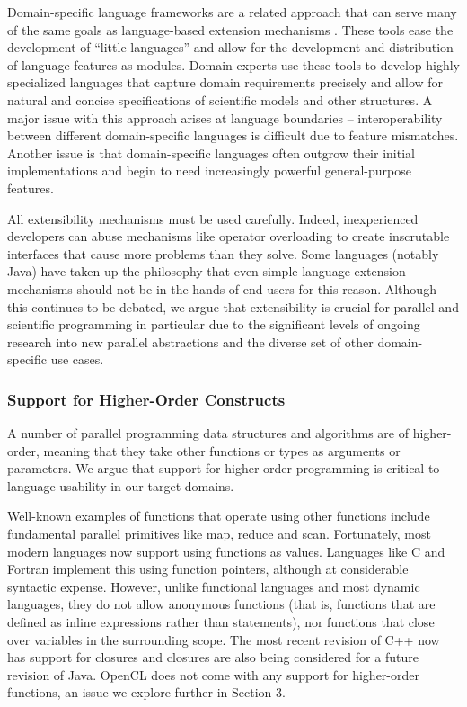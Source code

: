 Domain-specific language frameworks are a related approach that can serve many of the same goals as language-based  extension mechanisms \cite{fowler2010domain}. These tools ease the development of ``little languages'' and allow for the development and distribution of language features as modules. Domain experts use these tools to develop highly specialized languages that capture domain requirements precisely and allow for natural and concise specifications of scientific models and other structures. A major issue with this approach arises at language boundaries -- interoperability between different domain-specific languages is difficult due to feature mismatches. Another issue is that domain-specific languages often outgrow their initial implementations and begin to need increasingly powerful general-purpose features.

All extensibility mechanisms must be used carefully. Indeed, inexperienced developers can abuse mechanisms like operator overloading to create inscrutable interfaces that cause more problems than they solve. Some languages (notably Java) have taken up the philosophy that even simple language extension mechanisms should not be in the hands of end-users for this reason. Although this continues to be debated, we argue that extensibility is crucial for parallel and scientific programming in particular due to the significant levels of ongoing research into new parallel abstractions and the diverse set of other domain-specific use cases.

\subsubsection{Support for Higher-Order Constructs}\label{hof}
A number of parallel programming data structures and algorithms are of higher-order, meaning that they take other functions or types as arguments or parameters. We argue that support for higher-order programming is critical to language usability in our target domains.

Well-known examples of functions that operate using other functions include fundamental parallel primitives like map, reduce and scan. Fortunately, most modern languages now support using functions as values. Languages like C and Fortran implement this using function pointers, although at considerable syntactic expense. However, unlike functional languages and most dynamic languages, they do not allow anonymous functions (that is, functions that are defined as inline expressions rather than statements), nor functions that close over variables in the surrounding scope. The most recent revision of C++ now has support for closures and closures are also being considered for a future revision of Java. OpenCL does not come with any support for higher-order functions, an issue we explore further in Section 3.

